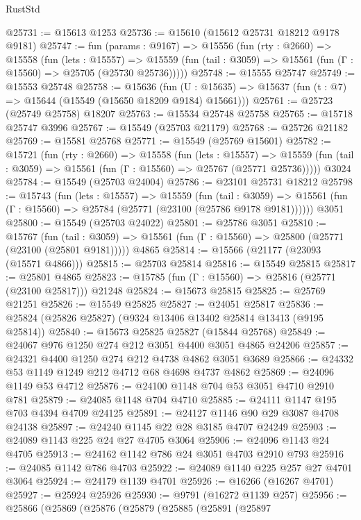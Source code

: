 \begin{lexlean}{RustStd}
\begin{coremodule}
@25731 := @15613 @1253
@25736 := @15610 (@15612 @25731 @18212 @9178 @9181)
@25747 := fun (params : @9167) =>
  @15556
    (fun (rty : @2660) =>
    @15558
      (fun (lets : @15557) =>
      @15559 (fun (tail : @3059) => @15561 (fun (Γ : @15560) => @25705 (@25730 @25736)))))
@25748 := @15555 @25747
@25749 := @15553 @25748
@25758 := @15636
    (fun (U : @15635) => @15637 (fun (t : @7) => @15644 (@15549 (@15650 @18209 @9184) @15661)))
@25761 := @25723 (@25749 @25758) @18207
@25763 := @15534 @25748 @25758
@25765 := @15718 @25747 @3996
@25767 := @15549 (@25703 @21179)
@25768 := @25726 @21182
@25769 := @15581 @25768
@25771 := @15549 (@25769 @15601)
@25782 := @15721
    (fun (rty : @2660) =>
    @15558
      (fun (lets : @15557) =>
      @15559 (fun (tail : @3059) => @15561 (fun (Γ : @15560) => @25767 (@25771 @25736)))))
    @3024
@25784 := @15549 (@25703 @24004)
@25786 := @23101 @25731 @18212
@25798 := @15743
    (fun (lets : @15557) =>
    @15559
      (fun (tail : @3059) =>
      @15561 (fun (Γ : @15560) => @25784 (@25771 (@23100 (@25786 @9178 @9181))))))
    @3051
@25800 := @15549 (@25703 @24022)
@25801 := @25786 @3051
@25810 := @15767
    (fun (tail : @3059) => @15561 (fun (Γ : @15560) => @25800 (@25771 (@23100 (@25801 @9181)))))
    @4865
@25814 := @15566 (@21177 (@23093 (@15571 @4866)))
@25815 := @25703 @25814
@25816 := @15549 @25815
@25817 := @25801 @4865
@25823 := @15785 (fun (Γ : @15560) => @25816 (@25771 (@23100 @25817))) @21248
@25824 := @15673 @25815
@25825 := @25769 @21251
@25826 := @15549 @25825
@25827 := @24051 @25817
@25836 := @25824 (@25826 @25827) (@9324 @13406 @13402 @25814 @13413 (@9195 @25814))
@25840 := @15673 @25825 @25827 (@15844 @25768)
@25849 := @24067 @976 @1250 @274 @212 @3051 @4400 @3051 @4865 @24206
@25857 := @24321 @4400 @1250 @274 @212 @4738 @4862 @3051 @3689
@25866 := @24332 @53 @1149 @1249 @212 @4712 @68 @4698 @4737 @4862
@25869 := @24096 @1149 @53 @4712
@25876 := @24100 @1148 @704 @53 @3051 @4710 @2910 @781
@25879 := @24085 @1148 @704 @4710
@25885 := @24111 @1147 @195 @703 @4394 @4709 @24125
@25891 := @24127 @1146 @90 @29 @3087 @4708 @24138
@25897 := @24240 @1145 @22 @28 @3185 @4707 @24249
@25903 := @24089 @1143 @225 @24 @27 @4705 @3064
@25906 := @24096 @1143 @24 @4705
@25913 := @24162 @1142 @786 @24 @3051 @4703 @2910 @793
@25916 := @24085 @1142 @786 @4703
@25922 := @24089 @1140 @225 @257 @27 @4701 @3064
@25924 := @24179 @1139 @4701
@25926 := @16266 (@16267 @4701)
@25927 := @25924 @25926
@25930 := @9791 (@16272 @1139 @257)
@25956 := @25866
    (@25869
      (@25876
        (@25879
          (@25885
            (@25891
              (@25897

\end{coremodule}
\end{lexlean}

